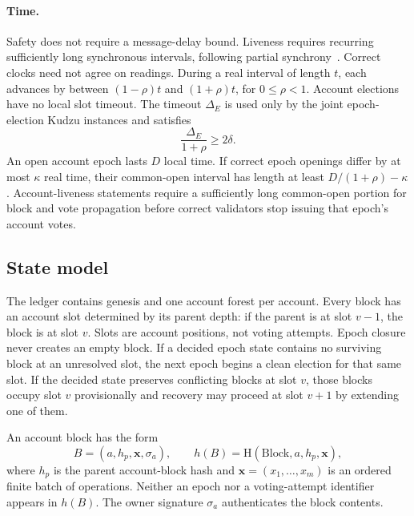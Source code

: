 \documentclass[10pt,twocolumn]{article}
\newcommand{\Hash}{\mathrm{H}}
\begin{document}
\paragraph{Time.} Safety does not require a message-delay bound. Liveness requires recurring sufficiently long synchronous intervals, following partial synchrony~\cite{DLS,Kudzu}. Correct clocks need not agree on readings. During a real interval of length $t$, each advances by between $(1-\rho)t$ and $(1+\rho)t$, for $0\le \rho<1$. Account elections have no local slot timeout. The timeout $\Delta_E$ is used only by the joint epoch-election Kudzu instances and satisfies
\begin{equation}
\frac{\Delta_E}{1+\rho} \ge 2\delta.
\end{equation}
An open account epoch lasts $D$ local time. If correct epoch openings differ by at most $\kappa$ real time, their common-open interval has length at least $D/(1+\rho)-\kappa$. Account-liveness statements require a sufficiently long common-open portion for block and vote propagation before correct validators stop issuing that epoch's account votes.

\subsection{State model}
The ledger contains genesis and one account forest per account. Every block has an account slot determined by its parent depth: if the parent is at slot $v-1$, the block is at slot $v$. Slots are account positions, not voting attempts. Epoch closure never creates an empty block. If a decided epoch state contains no surviving block at an unresolved slot, the next epoch begins a clean election for that same slot. If the decided state preserves conflicting blocks at slot $v$, those blocks occupy slot $v$ provisionally and recovery may proceed at slot $v+1$ by extending one of them.

An account block has the form
\begin{equation}
B=(a,h_p,\mathbf{x},\sigma_a),\qquad h(B)=\Hash(\mathrm{Block},a,h_p,\mathbf{x}),
\end{equation}
where $h_p$ is the parent account-block hash and $\mathbf{x}=(x_1,\ldots,x_m)$ is an ordered finite batch of operations. Neither an epoch nor a voting-attempt identifier appears in $h(B)$. The owner signature $\sigma_a$ authenticates the block contents.
\end{document}
